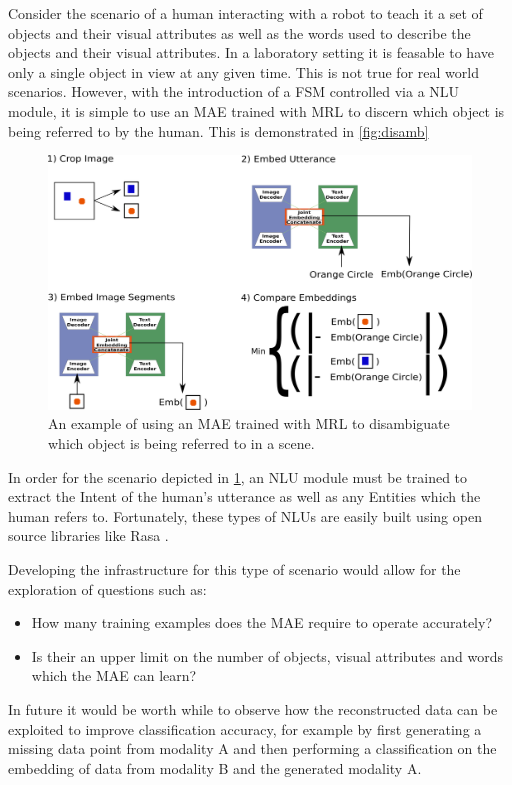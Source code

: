 Consider the scenario of a human interacting with a robot to teach it a set of objects and their visual attributes as well as the words used to describe the objects and their visual attributes. In a laboratory setting it is feasable to have only a single object in view at any given time. This is not true for real world scenarios. However, with the introduction of a \ac{FSM} controlled via a \ac{NLU} module, it is simple to use an \ac{MAE} trained with \ac{MRL} to discern which object is being referred to by the human. This is demonstrated in \autoref{fig:disamb}

\begin{figure}
\centering
\includegraphics[width=\textwidth]{Figs/shapes/findingRefferant.png}
\caption{An example of using an MAE trained with MRL to disambiguate which object is being referred to in a scene.}
\label{fig:disamb}
\end{figure}

In order for the scenario depicted in \ref{fig:disamb}, an \ac{NLU} module must be trained to extract the Intent of the human's utterance as well as any Entities which the human refers to. Fortunately, these types of \acp{NLU} are easily built using open source libraries like Rasa \cite{rasa}.



Developing the infrastructure for this type of scenario would allow for the exploration of questions such as:

\begin{itemize}
\item How many training examples does the \ac{MAE} require to operate accurately?
\item Is their an upper limit on the number of objects, visual attributes and words which the \ac{MAE} can learn?
\end{itemize}

In future it would be worth while to observe how the reconstructed data can be exploited to improve classification accuracy, for example by first generating a missing data point from modality A and then performing a classification on the embedding of data from modality B and the generated modality A.
